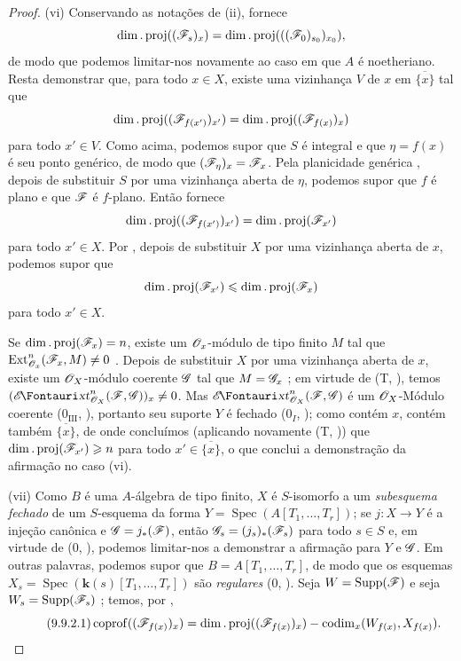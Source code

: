 \begin{proof}
(vi) Conservando as notações de (ii),  fornece
\[
  \dim.\operatorname{proj}((\mathscr{F}_s)_x)
  =\dim.\operatorname{proj}(((\mathscr{F}_0)_{s_0})_{x_0}),
\]
de modo que podemos limitar-nos novamente ao caso em que $A$ é noetheriano. Resta demonstrar que, para todo $x\in X$, existe uma vizinhança $V$ de $x$ em $\overline{\{x\}}$ tal que
\[
  \dim.\operatorname{proj}((\mathscr{F}_{f(x')})_{x'})
  =\dim.\operatorname{proj}((\mathscr{F}_{f(x)})_x)
\]
para todo $x'\in V$. Como acima, podemos supor que $S$ é integral e que $\eta=f(x)$ é seu ponto genérico, de modo que $(\mathscr{F}_\eta)_x=\mathscr{F}_x$. Pela planicidade genérica , depois de substituir $S$ por uma vizinhança aberta de $\eta$, podemos supor que $f$ é plano e que $\mathscr{F}$ é $f$-plano. Então  fornece
\[
  \dim.\operatorname{proj}((\mathscr{F}_{f(x')})_{x'})
  =\dim.\operatorname{proj}(\mathscr{F}_{x'})
\]
para todo $x'\in X$. Por , depois de substituir $X$ por uma vizinhança aberta de $x$, podemos supor que
\[
  \dim.\operatorname{proj}(\mathscr{F}_{x'})
  \leqslant\dim.\operatorname{proj}(\mathscr{F}_x)
\]
para todo $x'\in X$.

Se $\dim.\operatorname{proj}(\mathscr{F}_x)=n$, existe um $\mathscr{O}_x$-módulo de tipo finito $M$ tal que $\operatorname{Ext}^n_{\mathscr{O}_x}(\mathscr{F}_x,M)\neq 0$ .
Depois de substituir $X$ por uma vizinhança aberta de $x$, existe um $\mathscr{O}_X$-módulo coerente $\mathscr{G}$ tal que $M=\mathscr{G}_x$ ;
em virtude de (T, ), temos $(\shExt^n_{\sh{O}_X}(\sh{F},\sh{G}))_x\neq 0$.
Mas $\shExt^n_{\sh{O}_X}(\sh{F},\sh{G})$ é um $\mathscr{O}_X$-Módulo coerente ($0_{\mathrm{III}}$, ), portanto seu suporte $Y$ é fechado ($0_I$, ); como contém $x$, contém também $\overline{\{x\}}$, de onde concluímos (aplicando novamente (T, )) que $\dim.\operatorname{proj}(\mathscr{F}_{x'})\geqslant n$ para todo $x'\in\overline{\{x\}}$, o que conclui a demonstração da afirmação no caso (vi).

(vii) Como $B$ é uma $A$-álgebra de tipo finito, $X$ é $S$-isomorfo a um \emph{subesquema fechado} de um $S$-esquema da forma $Y=\operatorname{Spec}(A[T_1,\ldots,T_r])$; se $j:X\to Y$ é a injeção canônica e $\mathscr{G}=j_*(\mathscr{F})$, então $\mathscr{G}_s=(j_s)_*(\mathscr{F}_s)$ para todo $s\in S$ e, em virtude de ($0$, ), podemos limitar-nos a demonstrar a afirmação para $Y$ e $\mathscr{G}$.
Em outras palavras, podemos supor que $B=A[T_1,\ldots,T_r]$, de modo que os esquemas $X_s=\operatorname{Spec}(\mathbf{k}(s)[T_1,\ldots,T_r])$ são \emph{regulares} ($0$, ).
Seja $W=\operatorname{Supp}(\mathscr{F})$ e seja $W_s=\operatorname{Supp}(\mathscr{F}_s)$ ; temos, por ,
\begin{equation}
\tag{9.9.2.1}
\label{IV.9.9.2.1}
  \operatorname{coprof}((\sh{F}_{f(x)})_x)=\dim.\operatorname{proj}((\sh{F}_{f(x)})_x)-\operatorname{codim}_x(W_{f(x)},X_{f(x)}).
\end{equation}


\end{proof}
